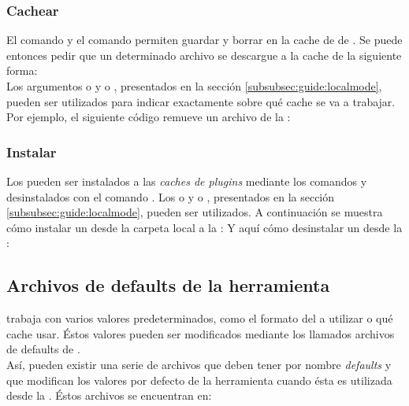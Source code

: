 \subsubsection{Cachear \dependencies}
\label{subsubsec:commands:cache}

El comando  y el comando  permiten guardar y borrar
\dependencies en la cache de \dependencies de \fronttier. Se puede entonces pedir 
que un determinado archivo se descargue a la cache de la siguiente forma:\\
Los argumentos  o  y  o 
, presentados en la sección \ref{subsubsec:guide:localmode}, pueden 
ser utilizados para indicar exactamente sobre qué cache se va a trabajar. Por 
ejemplo, el siguiente código remueve un archivo de la \cachel:

\subsubsection{Instalar \plugins}
\label{subsubsec:commands:plugins}

Los \plugins pueden ser instalados a las \emph{caches de plugins} mediante los 
comandos  y desinstalados con el comando . Los \flags
{} o  y  o , presentados 
en la sección \ref{subsubsec:guide:localmode}, pueden ser utilizados. A 
continuación se muestra cómo instalar un \plugin desde la carpeta local a la 
\plugincacheg:
Y aquí cómo desinstalar un \plugin desde la \plugincachel:

\subsection{Archivos de defaults de la herramienta}
\label{subsec:guide:conffiles}

\fronttier trabaja con varios valores predeterminados, como el formato del 
\conffile a utilizar o qué cache usar. Éstos valores pueden ser modificados 
mediante los llamados archivos de defaults de \fronttier.\\
Así, pueden existir una serie de archivos que deben tener por nombre 
\emph{defaults} y que modifican los valores por defecto de la herramienta 
cuando ésta es utilizada desde la \cli. Éstos archivos se 
encuentran en:

